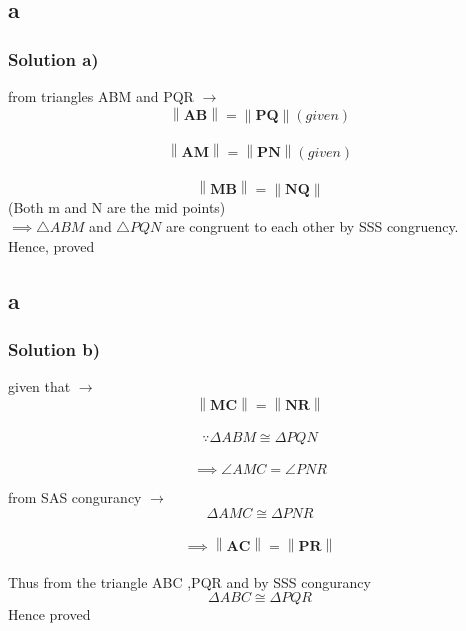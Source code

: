 \documentclass{beamer}
\newcommand\norm[1]{\left\lVert#1\right\rVert}
\renewcommand{\vec}[1]{\mathbf{#1}}
\begin{document}
\subsection{a}
\begin{frame}
\frametitle{Solution a)}
\footnotesize
\label{a}
from triangles ABM and PQR $\to$
\\
$$\norm{\vec{AB}}=\norm{\vec{PQ}}(given)$$
\\
$$\norm{\vec{AM}}=\norm{\vec{PN}}(given)$$
\\
$$\norm{\vec{MB}} =\norm{\vec{NQ}}$$(Both m and N are the mid points)
\newline
\\
$\implies \triangle ABM$ and $\triangle PQN$ are congruent to each other by SSS congruency.
\\
Hence, proved
\end{frame}

\subsection{a}
\begin{frame}
	\frametitle{Solution b)}
	\footnotesize
	\label{b}
		given that $\to$
	\\
	$$\norm{\vec{MC}} = \norm{\vec{NR}}$$ 
	\\
	$$\because \Delta ABM \cong \Delta PQN $$
	\\
	$$\implies \angle AMC = \angle PNR$$
	
	from SAS congurancy $ \to$
	\\
	$$\Delta AMC \cong \Delta PNR$$
	\\
	$$\implies \norm{\vec{AC}} = \norm{\vec{PR}}$$
	\\
	Thus from the triangle ABC ,PQR and by SSS congurancy 
	$$\Delta ABC \cong \Delta PQR$$
	\centering Hence proved
\end{frame}
\end{document}

